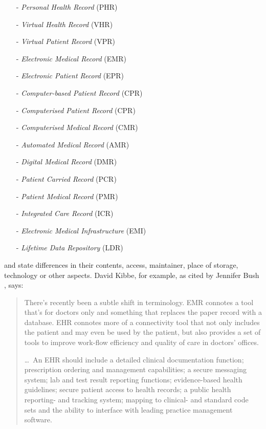 \begin{itemize}
    \item[-] \emph{Personal Health Record} (PHR)
    \item[-] \emph{Virtual Health Record} (VHR)
    \item[-] \emph{Virtual Patient Record} (VPR)
    \item[-] \emph{Electronic Medical Record} (EMR)
    \item[-] \emph{Electronic Patient Record} (EPR)
    \item[-] \emph{Computer-based Patient Record} (CPR)
    \item[-] \emph{Computerised Patient Record} (CPR)
    \item[-] \emph{Computerised Medical Record} (CMR)
    \item[-] \emph{Automated Medical Record} (AMR)
    \item[-] \emph{Digital Medical Record} (DMR)
    \item[-] \emph{Patient Carried Record} (PCR)
    \item[-] \emph{Patient Medical Record} (PMR)
    \item[-] \emph{Integrated Care Record} (ICR)
    \item[-] \emph{Electronic Medical Infrastructure} (EMI)
    \item[-] \emph{Lifetime Data Repository} (LDR)
\end{itemize}

and state differences in their contents, access, maintainer, place of storage,
technology or other aspects. David Kibbe, for example, as cited by Jennifer
Bush \cite{bush}, says:

\begin{quote}
    There's recently been a subtle shift in terminology. EMR connotes a tool
    that's for doctors only and something that replaces the paper record with a
    database. EHR connotes more of a connectivity tool that not only includes
    the patient and may even be used by the patient, but also provides a set of
    tools to improve work-flow efficiency and quality of care in doctors' offices.

    \ldots\ An EHR should include a detailed clinical documentation function;
    prescription ordering and management capabilities; a secure messaging
    system; lab and test result reporting functions; evidence-based health
    guidelines; secure patient access to health records; a public health
    reporting- and tracking system; mapping to clinical- and standard code sets
    and the ability to interface with leading practice management software.
\end{quote}

